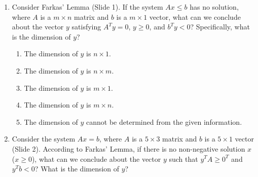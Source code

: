 \documentclass{article}%
\begin{document}
\begin{enumerate}
\begin{enumerate}
\begin{enumerate}%
\item Such a vector $y$ always exists.%
\item Such a vector $y$ may or may not exist.%
\item Such a vector $y$ never exists.%
\item The existence of $y$ depends on the specific values of $A$ and $b$.%
\item The existence of $y$ depends on the rank of matrix $A$.%
\end{enumerate}%
\vspace{0.5em}%
\item Consider the three variants of Farkas' Lemma presented in Slide 4.  Which variant directly addresses the solvability of the system $Ax \le b$ without any non-negativity constraints on $x$?%
\begin{enumerate}%
\item Variant (i)%
\item Variant (ii)%
\item Variant (iii)%
\item Variants (i) and (ii)%
\item None of the variants directly address this.%
\end{enumerate}%
\vspace{0.5em}%
\end{enumerate}%
\item Consider Farkas' Lemma (Slide 1).  If the system $Ax \le b$ has no solution, where $A$ is a $m \times n$ matrix and $b$ is a $m \times 1$ vector, what can we conclude about the vector $y$ satisfying $A^T y = 0$, $y \ge 0$, and $b^T y < 0$?  Specifically, what is the dimension of $y$?%
\begin{enumerate}%
\item The dimension of $y$ is $n \times 1$.%
\item The dimension of $y$ is $n \times m$.%
\item The dimension of $y$ is $m \times 1$.%
\item The dimension of $y$ is $m \times n$.%
\item The dimension of $y$ cannot be determined from the given information.%
\end{enumerate}%
\vspace{1em}%
\item Consider the system $Ax = b$, where $A$ is a $5 \times 3$ matrix and $b$ is a $5 \times 1$ vector (Slide 2).  According to Farkas' Lemma, if there is no non-negative solution $x$ ($x \ge 0$), what can we conclude about the vector $y$ such that $y^T A \ge 0^T$ and $y^T b < 0$? What is the dimension of $y$?%

\end{enumerate}
\end{document}
